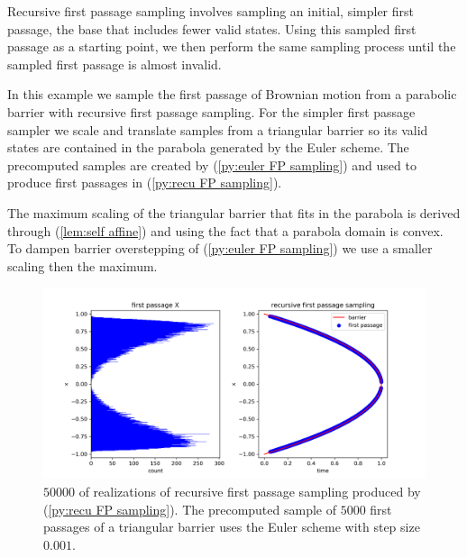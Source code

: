 \documentclass[a4paper,12pt]{article}
\begin{document}
\begin{technique}
    Recursive first passage sampling involves sampling an initial,
    simpler first passage, the base  that includes fewer valid states. Using
    this sampled first passage as a starting point, we
    then perform the same sampling process until the sampled
    first passage is almost invalid.
\end{technique}


\begin{example} \label{ex:recursive first passage sampling}
    In this example we sample the first passage of Brownian motion from a parabolic barrier
    with recursive first passage sampling.
    For the simpler first passage sampler we scale and translate
    samples from a triangular barrier so its
    valid states are contained in the parabola generated
    by the Euler scheme. The precomputed samples are created
    by (\ref{py:euler FP sampling}) and used to produce first passages
    in (\ref{py:recu FP sampling}).

\end{example}

\begin{pythonn} \label{py:euler FP sampling}
\end{pythonn}

\begin{pythonn} \label{py:recu FP sampling}
    The maximum scaling of the triangular barrier that fits
    in the parabola is derived through (\ref{lem:self affine})
    and using the fact that a parabola domain is convex. To dampen barrier
    overstepping of (\ref{py:euler FP sampling}) we use a smaller scaling
    then the maximum. \\

    \begin{figure}[ht!]
        \centering
        \includegraphics[width=1\textwidth]{plots/recursive first passage para.png}
        \caption{ $50000$ of realizations of recursive first passage sampling produced
            by (\ref{py:recu FP sampling}). The precomputed sample of $5000$ first
            passages of a triangular barrier uses the Euler scheme with
            step size $0.001$.}
        \label{fig:recursive first passage para}
    \end{figure}
\end{pythonn}
\end{document}

